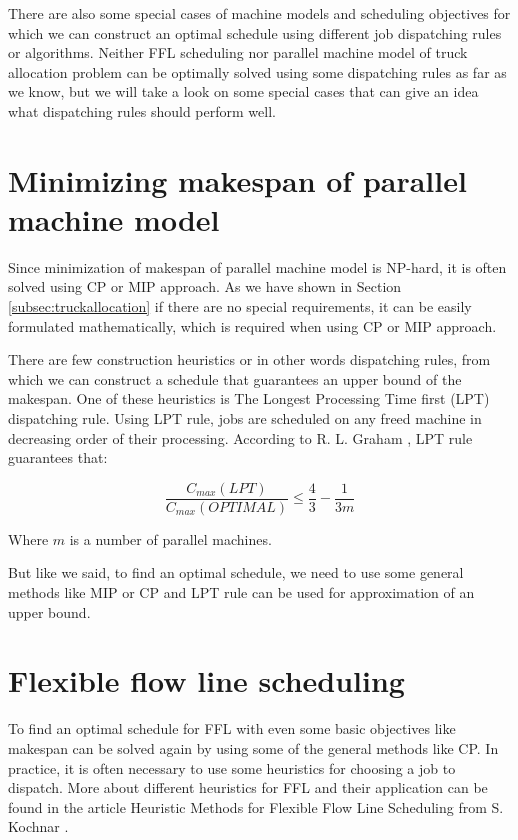\documentclass{ctuthesis}
\begin{document}
There are also some special cases of machine models and scheduling objectives for which we can construct an optimal schedule using different job dispatching rules or algorithms. Neither FFL scheduling nor parallel machine model of truck allocation problem can be optimally solved using some dispatching rules as far as we know, but we will take a look on some special cases that can give an idea what dispatching rules should perform well.


\section{Minimizing makespan of parallel machine model}

Since minimization of makespan of parallel machine model is NP-hard, it is often solved using CP or MIP approach. As we have shown in Section \ref{subsec:truckallocation} if there are no special requirements, it can be easily formulated mathematically, which is required when using CP or MIP approach. 

There are few construction heuristics or in other words dispatching rules, from which we can construct a schedule that guarantees an upper bound of the makespan. One of these heuristics is The Longest Processing Time first (LPT) dispatching rule. Using LPT rule, jobs are scheduled on any freed machine in decreasing order of their processing.
According to R. L. Graham \cite{gram1969}, LPT rule guarantees that:

\begin{equation}
\dfrac{C_{max}(LPT)}{C_{max}(OPTIMAL)} \leq \dfrac{4}{3} - \dfrac{1}{3m}
\end{equation}

Where $m$ is a number of parallel machines.

But like we said, to find an optimal schedule, we need to use some general methods like MIP or CP and LPT rule can be used for approximation of an upper bound.

\section{Flexible flow line scheduling}
\label{subsec:ffl}
To find an optimal schedule for FFL with even some basic objectives like makespan can be solved again by using some of the general methods like CP. In practice, it is often necessary to use some heuristics for choosing a job to dispatch. More about different heuristics for FFL and their application can be found in the article Heuristic Methods for Flexible Flow Line Scheduling from S. Kochnar \cite{FFLL}.
\end{document}
